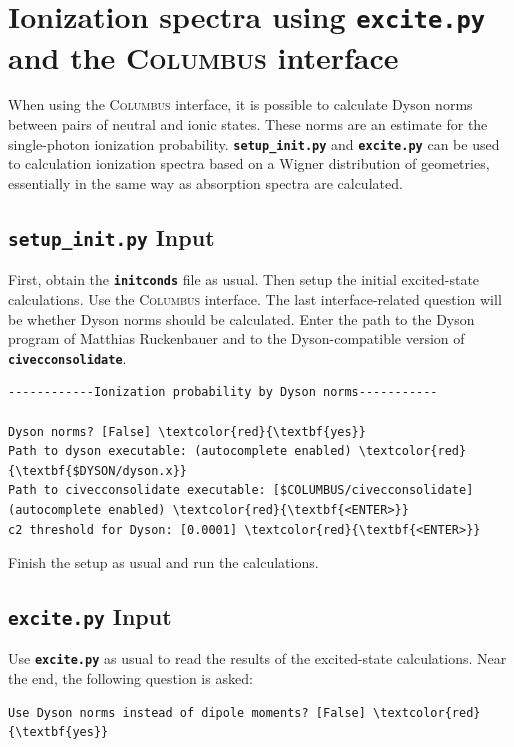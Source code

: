 \documentclass[a4paper,11pt,DIV=15,openany]{scrbook}
\newcommand{\ttt}[1]{\textbf{\texttt{#1}}}
\begin{document}
\section{Ionization spectra using \ttt{excite.py} and the \textsc{Columbus} interface}

When using the \textsc{Columbus} interface, it is possible to calculate Dyson norms between pairs of neutral and ionic states. These norms are an estimate for the single-photon ionization probability. \ttt{setup\_init.py} and \ttt{excite.py} can be used to calculation ionization spectra based on a Wigner distribution of geometries, essentially in the same way as absorption spectra are calculated.

\subsection{\ttt{setup\_init.py} Input}

First, obtain the \ttt{initconds} file as usual. Then setup the initial excited-state calculations. Use the \textsc{Columbus} interface. The last interface-related question will be whether Dyson norms should be calculated. Enter the path to the Dyson program of Matthias Ruckenbauer and to the Dyson-compatible version of \ttt{civecconsolidate}.
\begin{oframed}
\footnotesize\begin{Verbatim}[commandchars=\\\{\}]
------------Ionization probability by Dyson norms-----------

Dyson norms? [False] \textcolor{red}{\textbf{yes}}
Path to dyson executable: (autocomplete enabled) \textcolor{red}{\textbf{$DYSON/dyson.x}}
Path to civecconsolidate executable: [$COLUMBUS/civecconsolidate] (autocomplete enabled) \textcolor{red}{\textbf{<ENTER>}}
c2 threshold for Dyson: [0.0001] \textcolor{red}{\textbf{<ENTER>}}
\end{Verbatim}
\end{oframed}

\normalsize
Finish the setup as usual and run the calculations.

\subsection{\ttt{excite.py} Input}

Use \ttt{excite.py} as usual to read the results of the excited-state calculations. Near the end, the following question is asked:
\begin{oframed}
\footnotesize\begin{Verbatim}[commandchars=\\\{\}]
Use Dyson norms instead of dipole moments? [False] \textcolor{red}{\textbf{yes}}
\end{Verbatim}
\end{oframed}
\end{document}
